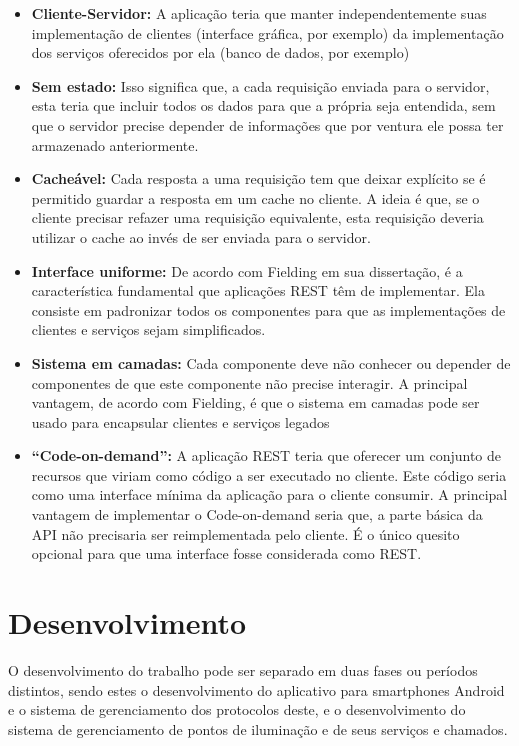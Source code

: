 \documentclass[
	article,			%
	11pt,				%
	oneside,			%
	a4paper,			%
	english,			%
	brazil,				%
	sumario=tradicional
	]{abntex2}
\begin{document}
\begin{itemize}
\item \textbf{Cliente-Servidor:} A aplicação teria que manter independentemente suas
implementação de clientes (interface gráfica, por exemplo) da implementação dos
serviços oferecidos por ela (banco de dados, por exemplo)

\item \textbf{Sem estado:} Isso significa que, a cada requisição enviada para o servidor,
esta teria que incluir todos os dados para que a própria seja entendida,
sem que o servidor precise depender de informações que por ventura ele possa
ter armazenado anteriormente.

\item \textbf{Cacheável:} Cada resposta a uma requisição tem que deixar explícito se é
permitido guardar a resposta em um cache no cliente. A ideia é que, se o
cliente precisar refazer uma requisição equivalente, esta requisição deveria
utilizar o cache ao invés de ser enviada para o servidor.

\item \textbf{Interface uniforme:} De acordo com Fielding em sua dissertação, é a
característica fundamental que aplicações REST têm de implementar. Ela
consiste em padronizar todos os componentes para que as implementações de
clientes e serviços sejam simplificados.

\item \textbf{Sistema em camadas:} Cada componente deve não conhecer ou depender de
componentes de que este componente não precise interagir. A principal vantagem,
de acordo com Fielding, é que o sistema em camadas pode ser usado para
encapsular clientes e serviços legados

\item \textbf{“Code-on-demand”:} A aplicação REST teria que oferecer um conjunto de recursos
que viriam como código a ser executado no cliente. Este código seria como uma
interface mínima da aplicação para o cliente consumir. A principal vantagem de
implementar o Code-on-demand seria que, a parte básica da API não precisaria
ser reimplementada pelo cliente. É o único quesito opcional para que uma
interface fosse considerada como REST.
\end{itemize}

\section{Desenvolvimento}

O desenvolvimento do trabalho pode ser separado em duas fases ou períodos
distintos, sendo estes o desenvolvimento do aplicativo para smartphones Android
e o sistema de gerenciamento dos protocolos deste, e o desenvolvimento do
sistema de gerenciamento de pontos de iluminação e de seus serviços e chamados.
\end{document}

